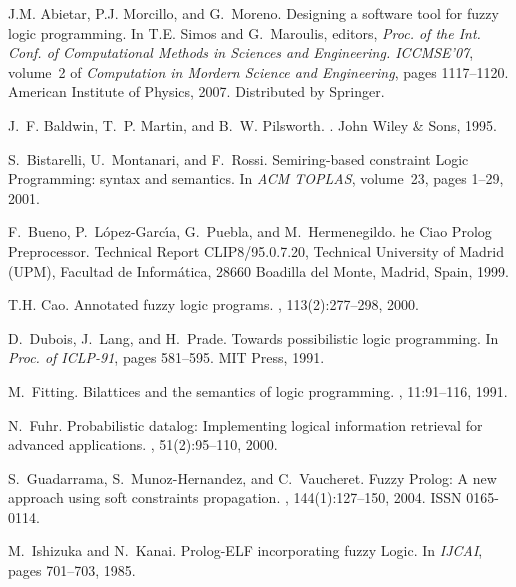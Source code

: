 \documentclass[runningheads,a4paper]{llncs}
\begin{document}
\begin{thebibliography}{10}

J.M. Abietar, P.J. Morcillo, and G.~Moreno.
\newblock Designing a software tool for fuzzy logic programming.
\newblock In T.E. Simos and G.~Maroulis, editors, {\em Proc. of the Int. Conf.
  of Computational Methods in Sciences and Engineering. ICCMSE'07}, volume~2 of
  {\em Computation in Mordern Science and Engineering}, pages 1117--1120.
  American Institute of Physics, 2007.
\newblock Distributed by Springer.

J.~F. Baldwin, T.~P. Martin, and B.~W. Pilsworth.
.
\newblock John Wiley \& Sons, 1995.

S.~Bistarelli, U.~Montanari, and F.~Rossi.
\newblock Semiring-based constraint {L}ogic {P}rogramming: syntax and
  semantics.
\newblock In {\em ACM TOPLAS}, volume~23, pages 1--29, 2001.

F.~Bueno, P.~L\'{o}pez-Garc\'{\i}a, G.~Puebla, and M.~Hermenegildo.
he {Ciao} {P}rolog {P}reprocessor.
\newblock Technical Report CLIP8/95.0.7.20, Technical University of Madrid
  (UPM), Facultad de Inform\'atica, 28660 Boadilla del Monte, Madrid, Spain,
  1999.

T.H. Cao.
\newblock Annotated fuzzy logic programs.
, 113(2):277--298, 2000.

D.~Dubois, J.~Lang, and H.~Prade.
\newblock Towards possibilistic logic programming.
\newblock In {\em Proc. of ICLP-91}, pages 581--595. MIT Press, 1991.

M.~Fitting.
\newblock Bilattices and the semantics of logic programming.
, 11:91--116, 1991.

N.~Fuhr.
\newblock Probabilistic datalog: Implementing logical information retrieval for
  advanced applications.
,
  51(2):95--110, 2000.

S.~Guadarrama, S.~Munoz-Hernandez, and C.~Vaucheret.
\newblock Fuzzy {P}rolog: A new approach using soft constraints propagation.
, 144(1):127--150, 2004.
\newblock ISSN 0165-0114.

M.~Ishizuka and N.~Kanai.
\newblock Prolog-{ELF} incorporating fuzzy {L}ogic.
\newblock In {\em {IJCAI}}, pages 701--703, 1985.


\end{thebibliography}
\end{document}
